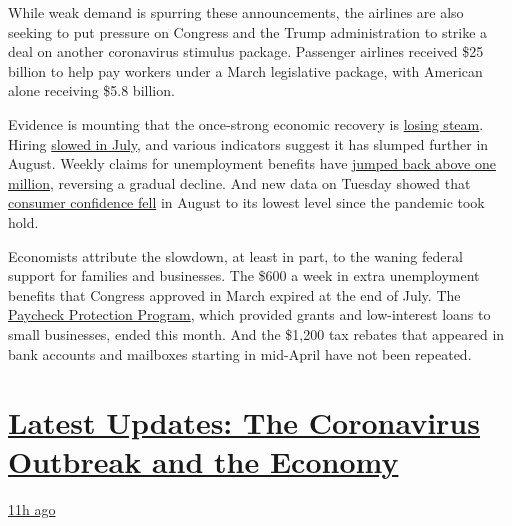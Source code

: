While weak demand is spurring these announcements, the airlines are also
seeking to put pressure on Congress and the Trump administration to
strike a deal on another coronavirus stimulus package. Passenger
airlines received \$25 billion to help pay workers under a March
legislative package, with American alone receiving \$5.8 billion.

Evidence is mounting that the once-strong economic recovery is
\href{https://www.nytimes3xbfgragh.onion/2020/08/21/business/economy/coronavirus-economic-recovery.html}{losing
steam}. Hiring
\href{https://www.nytimes3xbfgragh.onion/2020/08/07/business/economy/july-jobs-report.html}{slowed
in July}, and various indicators suggest it has slumped further in
August. Weekly claims for unemployment benefits have
\href{https://www.nytimes3xbfgragh.onion/2020/08/20/business/economy/unemployment-claims.html}{jumped
back above one million}, reversing a gradual decline. And new data on
Tuesday showed that
\href{https://conference-board.org/data/consumerconfidence.cfm}{consumer
confidence fell} in August to its lowest level since the pandemic took
hold.

Economists attribute the slowdown, at least in part, to the waning
federal support for families and businesses. The \$600 a week in extra
unemployment benefits that Congress approved in March expired at the end
of July. The
\href{https://www.nytimes3xbfgragh.onion/2020/08/06/business/small-businesses-relief-program-ending.html}{Paycheck
Protection Program}, which provided grants and low-interest loans to
small businesses, ended this month. And the \$1,200 tax rebates that
appeared in bank accounts and mailboxes starting in mid-April have not
been repeated.

\hypertarget{latest-updates-the-coronavirus-outbreak-and-the-economy}{%
\section{\texorpdfstring{\href{https://www.nytimes3xbfgragh.onion/live/2020/09/11/business/stock-market-today-coronavirus?action=click\&pgtype=Article\&state=default\&region=MAIN_CONTENT_1\&context=storylines_live_updates}{Latest
Updates: The Coronavirus Outbreak and the
Economy}}{Latest Updates: The Coronavirus Outbreak and the Economy}}\label{latest-updates-the-coronavirus-outbreak-and-the-economy}}

\href{https://www.nytimes3xbfgragh.onion/live/2020/09/11/business/stock-market-today-coronavirus?action=click\&pgtype=Article\&state=default\&region=MAIN_CONTENT_1\&context=storylines_live_updates\#the-nyse-may-move-its-data-center-out-of-new-jersey-in-response-to-a-proposed-tax}{11h
ago}


